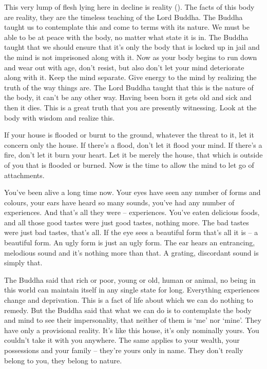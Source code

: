 This very lump of flesh lying here in decline is reality (). The facts of this body are reality, they are the timeless teaching of the Lord Buddha. The Buddha taught us to contemplate this and come to terms with its nature. We must be able to be at peace with the body, no matter what state it is in. The Buddha taught that we should ensure that it's only the body that is locked up in jail and the mind is not imprisoned along with it. Now as your body begins to run down and wear out with age, don't resist, but also don't let your mind deteriorate along with it. Keep the mind separate. Give energy to the mind by realizing the truth of the way things are. The Lord Buddha taught that this is the nature of the body, it can't be any other way. Having been born it gets old and sick and then it dies. This is a great truth that you are presently witnessing. Look at the body with wisdom and realize this.

If your house is flooded or burnt to the ground, whatever the threat to it, let it concern only the house. If there's a flood, don't let it flood your mind. If there's a fire, don't let it burn your heart. Let it be merely the house, that which is outside of you that is flooded or burned. Now is the time to allow the mind to let go of attachments.

You've been alive a long time now. Your eyes have seen any number of forms and colours, your ears have heard so many sounds, you've had any number of experiences. And that's all they were -- experiences. You've eaten delicious foods, and all those good tastes were just good tastes, nothing more. The bad tastes were just bad tastes, that's all. If the eye sees a beautiful form that's all it is -- a beautiful form. An ugly form is just an ugly form. The ear hears an entrancing, melodious sound and it's nothing more than that. A grating, discordant sound is simply that.

The Buddha said that rich or poor, young or old, human or animal, no being in this world can maintain itself in any single state for long. Everything experiences change and deprivation. This is a fact of life about which we can do nothing to remedy. But the Buddha said that what we can do is to contemplate the body and mind to see their impersonality, that neither of them is `me' nor `mine'. They have only a provisional reality. It's like this house, it's only nominally yours. You couldn't take it with you anywhere. The same applies to your wealth, your possessions and your family -- they're yours only in name. They don't really belong to you, they belong to nature.

